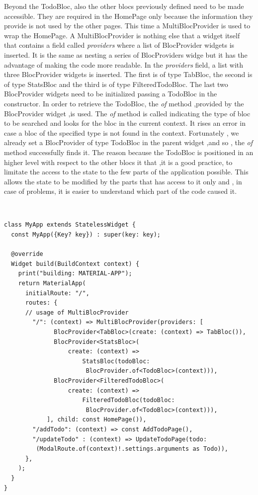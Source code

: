 Beyond the TodoBloc, also the other blocs previously defined need to be made accessible. They are required in the HomePage only because the information they provide is not used by the other pages. This time a MultiBlocProvider is used to wrap the HomePage.  A MultiBlocProvider is nothing else that a widget itself that contains a field called \textit{providers} where a list of BlocProvider widgets is inserted.  It is the same as nesting a series of BlocProviders widge but it has the advantage of making the code more readable. In the \textit{providers} field, a list with three BlocProvider widgets is inserted. The first is of type TabBloc, the second is of type StatsBloc and the third is of type FilteredTodoBloc. The last two BlocProvider widgets need to be initialized passing a TodoBloc in the constructor. In order to retrieve the TodoBloc, the \textit{of }method ,provided by the BlocProvider widget ,is used. The \textit{of} method is called indicating the type of bloc to be searched and looks for the bloc in the current context. It rises an error in case a bloc of the specified type is not found in the context. Fortunately , we already set a BlocProvider of type TodoBloc in the parent widget ,and so , the \textit{of} method successfully finds it. The reason because the TodoBloc is positioned in an higher level with respect to the other blocs it that ,it is a good practice, to limitate the access to the state to the few parts of the application possible. This allows the state to be modified by the parts that has access to it only and , in case of problems, it is easier to  understand which part of the code caused it.
\begin{code}
\mbox{}\\
 \mbox{}
\label{code:2.14}
\begin{verbatim}
class MyApp extends StatelessWidget {
  const MyApp({Key? key}) : super(key: key);

  @override
  Widget build(BuildContext context) {
    print("building: MATERIAL-APP");
    return MaterialApp(
      initialRoute: "/",
      routes: {
      // usage of MultiBlocProvider
        "/": (context) => MultiBlocProvider(providers: [
              BlocProvider<TabBloc>(create: (context) => TabBloc()),
              BlocProvider<StatsBloc>(
                  create: (context) =>
                      StatsBloc(todoBloc:
                       BlocProvider.of<TodoBloc>(context))),
              BlocProvider<FilteredTodoBloc>(
                  create: (context) =>
                      FilteredTodoBloc(todoBloc:
                       BlocProvider.of<TodoBloc>(context))),
            ], child: const HomePage()),
        "/addTodo": (context) => const AddTodoPage(),
        "/updateTodo" : (context) => UpdateTodoPage(todo:
         (ModalRoute.of(context)!.settings.arguments as Todo)),
      },
    );
  }
}
\end{verbatim}
\mbox{}
\end{code}


